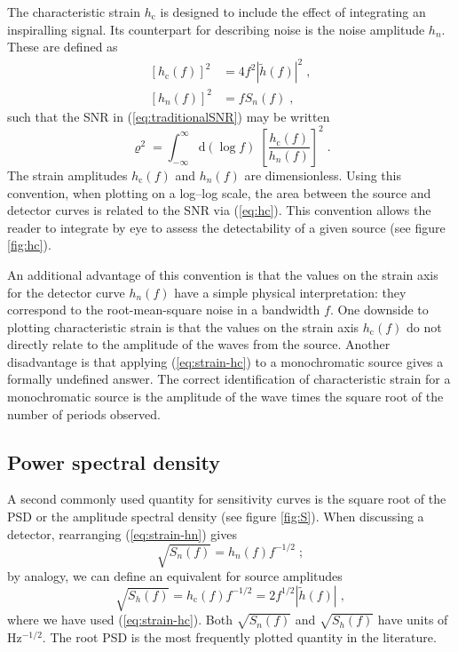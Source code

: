 The characteristic strain $h_\mathrm{c}$ is designed to include the effect of integrating an inspiralling signal. Its counterpart for describing noise is the noise amplitude $h_n$. These are defined as
\begin{eqnarray}\label{eq:strain-hc} 
\left[h_\mathrm{c}(f)\right]^{2} &= 4f^{2}\left| \tilde{h}(f) \right|^{2} \; ,\\
\left[h_{n}(f)\right]^{2} &= fS_{n}(f) \; ,
\label{eq:strain-hn}
\end{eqnarray}
such that the SNR in (\ref{eq:traditionalSNR}) may be written
\begin{equation}\label{eq:hc} 
\varrho^{2} = \int_{-\infty}^{\infty} \mathrm{d}\left(\log f\right)\; \left[\frac{h_\mathrm{c}(f)}{h_{n}(f)}\right]^{2} \;.
\end{equation}
The strain amplitudes $h_\mathrm{c}(f)$ and $h_{n}(f)$ are dimensionless. Using this convention, when plotting on a log--log scale, the area between the source and detector curves is related to the SNR via (\ref{eq:hc}). This convention allows the reader to integrate by eye to assess the detectability of a given source (see figure \ref{fig:hc}).

An additional advantage of this convention is that the values on the strain axis for the detector curve $h_n(f)$ have a simple physical interpretation: they correspond to the root-mean-square noise in a bandwidth $f$. One downside to plotting characteristic strain is that the values on the strain axis $h_\mathrm{c}(f)$ do not directly relate to the amplitude of the waves from the source. 
Another disadvantage is that applying (\ref{eq:strain-hc}) to a monochromatic source gives a formally undefined answer. The correct identification of characteristic strain for a monochromatic source is the amplitude of the wave times the square root of the number of periods observed. %

\subsection{Power spectral density}\label{sec:psd}

A second commonly used quantity for sensitivity curves is the square root of the PSD or the amplitude spectral density (see figure \ref{fig:S}). When discussing a detector, rearranging (\ref{eq:strain-hn}) gives
\begin{equation}\label{eq:temp1}
\sqrt{S_{n}(f)} = h_{n}(f)f^{-1/2} \; ;
\end{equation}
by analogy, we can define an equivalent for source amplitudes
\begin{equation}
\sqrt{S_{h}(f)} = h_\mathrm{c}(f)f^{-1/2} = 2 f^{1/2} \left| \tilde{h}(f) \right| \; ,
\label{eq:ShforSources}
\end{equation}
where we have used (\ref{eq:strain-hc}). Both $\sqrt{S_{n}(f)}$ and $\sqrt{S_{h}(f)}$ have units of $\mathrm{Hz^{-1/2}}$. The root PSD is the most frequently plotted quantity in the literature.

